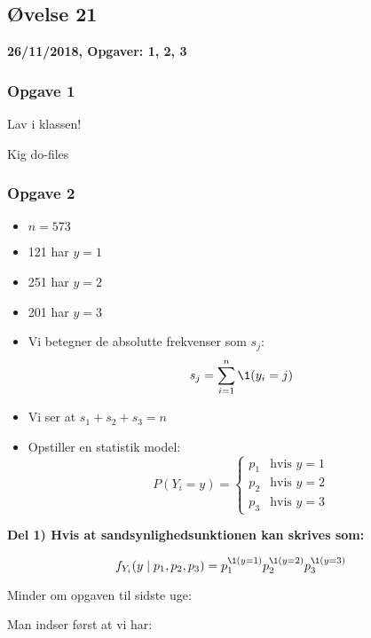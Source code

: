 \horizline

\subsection{Øvelse 21}

\textbf{26/11/2018, Opgaver: 1, 2, 3}


\subsubsection{Opgave 1}

Lav i klassen!

Kig do-files

\subsubsection{Opgave 2}

\begin{itemize}
    \item $n=573$
    \item 121 har $y=1$
    \item 251 har $y=2$
    \item 201 har $y=3$
    \item Vi betegner de absolutte frekvenser som $s_j$:
    \begin{equation}
        s_j = \sumn \1(y_i = j)
    \end{equation}
    \item Vi ser at $s_1 + s_2 + s_3 = n$
    \item Opstiller en statistik model:
    \begin{equation}
    P(Y_i = y) =
    \begin{cases}
        p_1 & \text{hvis } y=1 \\
        p_2 & \text{hvis } y=2 \\
        p_3 & \text{hvis } y=3
    \end{cases}
    \end{equation}
\end{itemize}

\textbf{Del 1) Hvis at sandsynlighedsunktionen kan skrives som:}

\begin{equation}
    f_{Y_i}(y \mid p_1, p_2, p_3) = p_1^{\1(y=1)} p_2^{\1(y=2)}p_3^{\1(y=3)}
\end{equation}

Minder om opgaven til sidste uge:

Man indser først at vi har:

